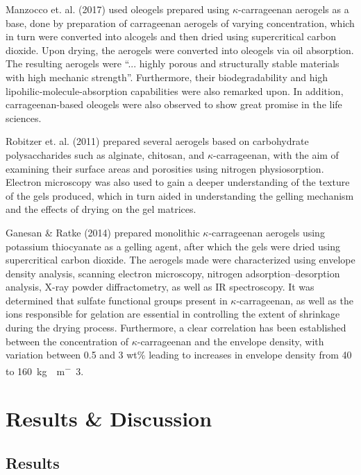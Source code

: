 \documentclass[a4paper,12pt]{article}
\begin{document}
Manzocco et. al. (2017) used oleogels prepared using $\kappa$-carrageenan aerogels as a base, done by preparation of carrageenan aerogels of varying concentration, which in turn were converted into alcogels and then dried using supercritical carbon dioxide. Upon drying, the aerogels were converted into oleogels via oil absorption. The resulting aerogels were “... highly porous and structurally stable materials with high mechanic strength”. Furthermore, their biodegradability and high lipohilic-molecule-absorption capabilities were also remarked upon. In addition, carrageenan-based oleogels were also observed to show great promise in the life sciences.\supercite{manzocco_exploitation_2017}

Robitzer et. al. (2011) prepared several aerogels based on carbohydrate polysaccharides such as alginate, chitosan, and $\kappa$-carrageenan, with the aim of examining their surface areas and porosities using nitrogen physiosorption. Electron microscopy was also used to gain a deeper understanding of the texture of the gels produced, which in turn aided in understanding the gelling mechanism and the effects of drying on the gel matrices.\supercite{robitzer_nitrogen_2011}

Ganesan \& Ratke (2014) prepared monolithic $\kappa$-carrageenan aerogels using potassium thiocyanate as a gelling agent, after which the gels were dried using supercritical carbon dioxide. The aerogels made were characterized using envelope density analysis, scanning electron microscopy, nitrogen adsorption–desorption analysis, X-ray powder diffractometry, as well as IR spectroscopy. It was determined that sulfate functional groups present in $\kappa$-carrageenan, as well as the ions responsible for gelation are essential in controlling the extent of shrinkage during the drying process. Furthermore, a clear correlation has been established between the concentration of $\kappa$-carrageenan and the envelope density, with variation between 0.5 and 3 wt\% leading to increases in envelope density from 40 to \SI{160}{kg\cdot m^-3}.\supercite{ganesan_facile_2014}

\pagebreak

\section{Results \& Discussion}

\subsection{Results}
\end{document}
